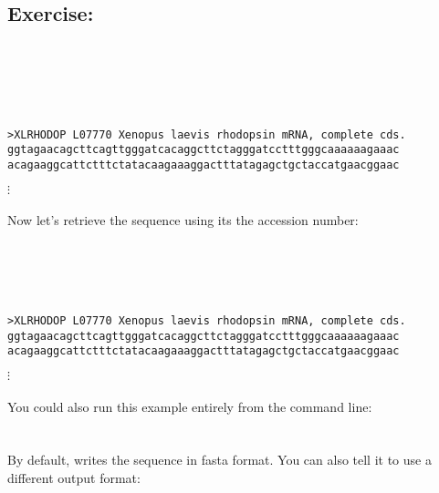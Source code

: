 \documentclass[12pt]{report}
\begin{document}
\subsection*{Exercise: }

\unix{}\\
\\
\\
\\

\unix{}
\begin{verbatim}
>XLRHODOP L07770 Xenopus laevis	rhodopsin mRNA,	complete cds.
ggtagaacagcttcagttgggatcacaggcttctagggatcctttgggcaaaaaagaaac
acagaaggcattctttctatacaagaaaggactttatagagctgctaccatgaacggaac
\end{verbatim}
$\vdots$
\\
\\
\noindent Now let's retrieve the sequence using	its the	accession
number:\\

\unix{}\\
\\
\\
\\

\unix{}
\begin{verbatim}
>XLRHODOP L07770 Xenopus laevis	rhodopsin mRNA,	complete cds.
ggtagaacagcttcagttgggatcacaggcttctagggatcctttgggcaaaaaagaaac
acagaaggcattctttctatacaagaaaggactttatagagctgctaccatgaacggaac
\end{verbatim}
$\vdots$
\\
\\
\noindent You could also run this example entirely from	the command line:\\

\unix{}
\\
\\
By default,  writes the sequence in fasta
format.	You can	also tell it to	use a different	output format:\\

\unix{}\\
\end{document}
